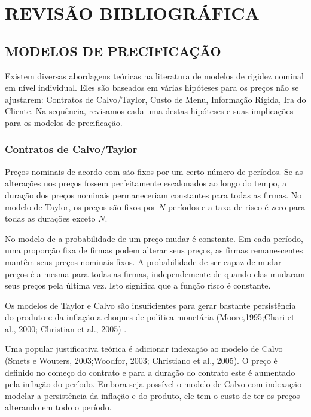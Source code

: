 \documentclass[twoside,a4paper,11pt]{report}
\begin{document}
\pagestyle{empty}
\cleardoublepage
\pagestyle{fancy}

\chapter{REVISÃO BIBLIOGRÁFICA}\label{cap2}

\section*{MODELOS DE PRECIFICAÇÃO}

Existem diversas abordagens teóricas na literatura de modelos de rigidez nominal em nível individual. Eles são baseados em várias hipóteses para os preços não se ajustarem: Contratos de Calvo/Taylor, Custo de Menu, Informação Rígida, Ira do Cliente. Na sequência, revisamos cada uma destas hipóteses e suas implicações para os modelos de precificação.

\subsection*{Contratos de Calvo/Taylor}

Preços nominais de acordo com \citet{taylor1980aggregate} são fixos por um certo número de períodos. Se as alterações nos preços fossem perfeitamente escalonados ao longo do tempo, a duração dos preços nominais permaneceriam constantes para todas as firmas. No modelo de Taylor, os preços são fixos por $N$ períodos e a taxa de risco é zero para todas as durações exceto $N$. 

No modelo de \citet{calvo1983staggered} a probabilidade de um preço mudar é constante. Em cada período, uma proporção fixa de firmas podem alterar seus preços, as firmas remanescentes mantêm seus preços nominais fixos. A probabilidade de ser capaz de mudar preços é a mesma para todas as firmas, independemente de quando elas mudaram seus preços pela última vez. Isto significa que a função risco é constante. 

Os modelos de Taylor e Calvo são insuficientes para gerar bastante persistência do produto e da inflação a choques de política monetária (Moore,1995;Chari et al., 2000; Christian et al., 2005) . 

Uma popular justificativa teórica é adicionar indexação ao modelo de Calvo (Smets e Wouters, 2003;Woodfor, 2003; Christiano et al., 2005). O preço é definido no começo do contrato e para a duração do contrato este é aumentado pela inflação do período. Embora seja possível o modelo de Calvo com indexação modelar a persistência da inflação e do produto, ele tem o custo de ter os preços alterando em todo o período. 
\end{document}
